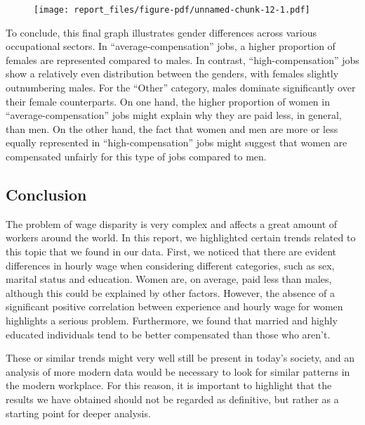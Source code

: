 \documentclass[
  letterpaper,
  DIV=11,
  numbers=noendperiod]{scrartcl}
\begin{document}
\begin{figure}[H]

{\centering \texttt{[image: report\_files/figure-pdf/unnamed-chunk-12-1.pdf]}

}

\end{figure}

To conclude, this final graph illustrates gender differences across
various occupational sectors. In ``average-compensation'' jobs, a higher
proportion of females are represented compared to males. In contrast,
``high-compensation'' jobs show a relatively even distribution between
the genders, with females slightly outnumbering males. For the ``Other''
category, males dominate significantly over their female counterparts.
On one hand, the higher proportion of women in ``average-compensation''
jobs might explain why they are paid less, in general, than men. On the
other hand, the fact that women and men are more or less equally
represented in ``high-compensation'' jobs might suggest that women are
compensated unfairly for this type of jobs compared to men.

\hypertarget{conclusion}{%
\subsection{Conclusion}\label{conclusion}}

The problem of wage disparity is very complex and affects a great amount
of workers around the world. In this report, we highlighted certain
trends related to this topic that we found in our data. First, we
noticed that there are evident differences in hourly wage when
considering different categories, such as sex, marital status and
education. Women are, on average, paid less than males, although this
could be explained by other factors. However, the absence of a
significant positive correlation between experience and hourly wage for
women highlights a serious problem. Furthermore, we found that married
and highly educated individuals tend to be better compensated than those
who aren't.

These or similar trends might very well still be present in today's
society, and an analysis of more modern data would be necessary to look
for similar patterns in the modern workplace. For this reason, it is
important to highlight that the results we have obtained should not be
regarded as definitive, but rather as a starting point for deeper
analysis.
\end{document}
